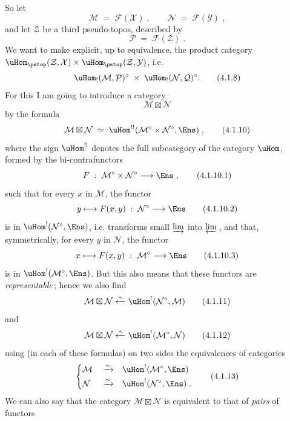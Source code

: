 So let
\[
\mathcal{M} \;=\; \mathcal{F}(\mathcal{X})\;, \qquad \mathcal{N} \;=\; \mathcal{F}(\mathcal{Y})\;,
\tag*{(4.1.6)}
\]
and let $\mathcal{Z}$ be a third pseudo-topos, described by
\[
\mathcal{P} \;=\; \mathcal{F}(\mathcal{Z})\;.
\tag*{(4.1.7)}
\]
We want to make explicit, up to equivalence, the product category $\uHom_{\pstop}(\mathcal{Z},\mathcal{X})\times\uHom_{\pstop}(\mathcal{Z},\mathcal{Y})$, i.e.
\[
\uHom_!(\mathcal{M},\mathcal{P})^\circ \;\times\; \uHom_!(\mathcal{N},\mathcal{Q})^\circ.
\tag*{(4.1.8)}
\] %
For this I am going to introduce a category
\[
\mathcal{M}\boxtimes\mathcal{N}
\tag*{(4.1.9)}
\]
by the formula
\[
\mathcal{M}\boxtimes\mathcal{N} \;\simeq\; \uHom^{!!}(\mathcal{M}^\circ\times\mathcal{N}^\circ,\Ens)\;,
\tag*{(4.1.10)}
\]
where the sign $\uHom^{!!}$ denotes the full subcategory of the category $\uHom$, formed by the bi-contrafunctors %
\[
F \;:\; \mathcal{M}^\circ\times\mathcal{N}^\circ \longrightarrow \Ens\;,
\tag*{(4.1.10.1)}
\]
such that for every $x$ in $\mathcal{M}$, the functor
\[
y \longmapsto F(x,y) \;:\; \mathcal{N}^\circ \longrightarrow \Ens
\tag*{(4.1.10.2)}
\]
is in $\uHom^!(\mathcal{N}^\circ,\Ens)$, i.e. transforms small $\varinjlim$ into $\varprojlim$\,, and that, symmetrically, for every $y$ in $\mathcal{N}$, the functor
\[
x \longmapsto F(x,y) \;:\; \mathcal{M}^\circ \longrightarrow \Ens
\tag*{(4.1.10.3)}
\]
is in $\uHom^!(\mathcal{M}^\circ,\Ens)$. But this also means that these functors are \textit{representable}\,; hence we also find
\[
\mathcal{M}\boxtimes\mathcal{N} \xleftarrow{\sim} \uHom^!(\mathcal{N}^\circ,\mathcal{M})
\tag*{(4.1.11)}
\]
and
\[
\mathcal{M}\boxtimes\mathcal{N} \xleftarrow{\sim} \uHom^!(\mathcal{M}^\circ,\mathcal{N})
\tag*{(4.1.12)}
\]
using (in each of these formulas) on two sides the equivalences of categories
\[
\left\{
\begin{aligned}
&\mathcal{M} &&\xrightarrow{\sim} &&\uHom^!(\mathcal{M}^\circ,\Ens)\\
&\mathcal{N} &&\xrightarrow{\sim} &&\uHom^!(\mathcal{N}^\circ,\Ens)\;.
\end{aligned}
\right.
\tag*{(4.1.13)}
\]
We can also say that the category $\mathcal{M}\boxtimes\mathcal{N}$ is equivalent to that of \textit{pairs} of functors
